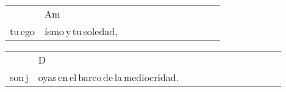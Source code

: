 \begin{multicols}{2}
\begin{minipage}{\columnwidth}
\noindent
\begin{tabular}{llllllllllll}
&Am\\
tu\,ego&ísmo\,y\,tu\,soledad,
\end{tabular}

\noindent
\begin{tabular}{llllllllllll}
&D\\
son\,j&oyas\,en\,el\,barco\,de\,la\,mediocridad.
\end{tabular}
\end{minipage}\\

\end{multicols}